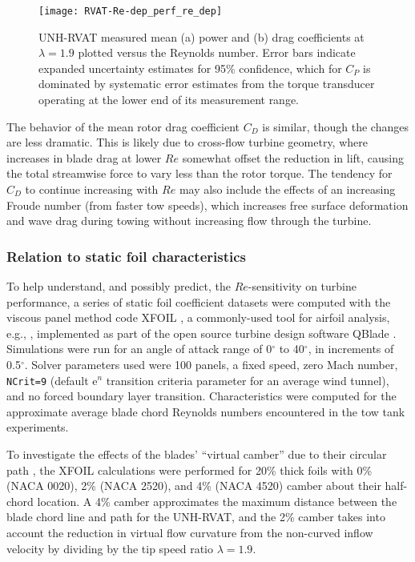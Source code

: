 \begin{figure}
    \centering
    
    \texttt{[image: RVAT-Re-dep\_perf\_re\_dep]}
    
    \caption{UNH-RVAT measured mean (a) power and (b) drag coefficients at
        $\lambda=1.9$ plotted versus the Reynolds number. Error bars indicate
        expanded uncertainty estimates for 95\% confidence, which for $C_P$ is dominated
        by systematic error estimates from the torque transducer operating at the lower
        end of its measurement range.}
    
    \label{fig:perf-Re-dep}
\end{figure}

The behavior of the mean rotor drag coefficient $C_D$ is similar, though the
changes are less dramatic. This is likely due to cross-flow turbine geometry,
where increases in blade drag at lower $Re$ somewhat offset the reduction in
lift, causing the total streamwise force to vary less than the rotor torque.
The tendency for $C_D$ to continue increasing with $Re$ may also include the
effects of an increasing Froude number (from faster tow speeds), which increases
free surface deformation and wave drag during towing without increasing flow
through the turbine.


\subsubsection{Relation to static foil characteristics}

To help understand, and possibly predict, the $Re$-sensitivity on turbine
performance, a series of static foil coefficient datasets were computed with the
viscous panel method code XFOIL \cite{Drela1989}, a commonly-used tool for
airfoil analysis, e.g., \cite{Castelli2011, Walker2014}, implemented as part of
the open source turbine design software QBlade \cite{Marten2013}. Simulations
were run for an angle of attack range of 0$^{\circ}$ to 40$^{\circ}$, in
increments of 0.5$^{\circ}$. Solver parameters used were 100 panels, a fixed
speed, zero Mach number, \texttt{NCrit=9} (default $\mathrm{e}^n$ transition
criteria parameter for an average wind tunnel), and no forced boundary layer
transition. Characteristics were computed for the approximate average blade
chord Reynolds numbers encountered in the tow tank experiments.

To investigate the effects of the blades' ``virtual camber'' due to their
circular path \cite{Migliore1980}, the XFOIL calculations were performed for
20\% thick foils with 0\% (NACA 0020), 2\% (NACA 2520), and 4\% (NACA 4520)
camber about their half-chord location. A 4\% camber approximates the maximum
distance between the blade chord line and path for the UNH-RVAT, and the 2\%
camber takes into account the reduction in virtual flow curvature from the
non-curved inflow velocity by dividing by the tip speed ratio $\lambda=1.9$.

